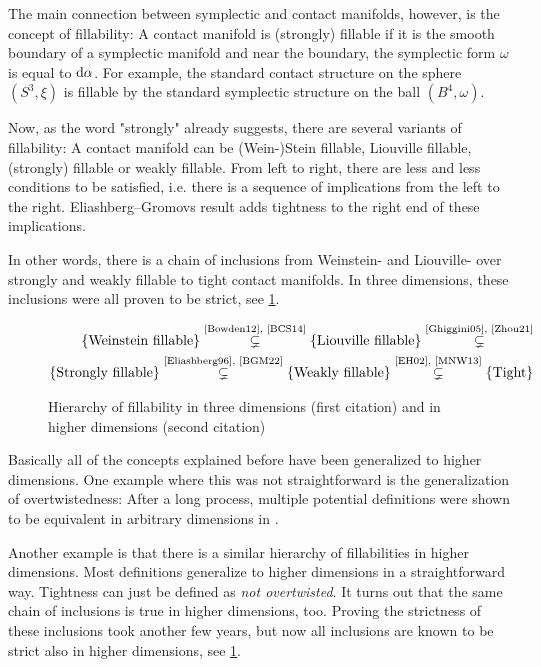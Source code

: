 The main connection between symplectic and contact manifolds, however, is the concept of fillability:
A contact manifold is (strongly) fillable if it is the smooth boundary of a symplectic manifold and
near the boundary, the symplectic form $\omega$ is equal to $\mathrm{d} \alpha$.
For example, the standard contact structure on the sphere $(S^3, \xi)$ is fillable
by the standard symplectic structure on the ball $(B^4, \omega)$.

Now, as the word "strongly" already suggests, there are several variants of fillability:
A contact manifold can be (Wein-)Stein fillable, Liouville fillable, (strongly) fillable or weakly fillable.
From left to right, there are less and less conditions to be satisfied, i.e. there is a sequence
of implications from the left to the right. 
Eliashberg--Gromovs result adds tightness to the right end of these implications.

In other words, there is a chain of inclusions from 
Weinstein- and Liouville- over strongly and weakly fillable to tight contact manifolds.
In three dimensions, these inclusions were all proven to be strict, see \cref{fig:fillability}.
\begin{figure}
    \begin{align*}
        \{\text{Weinstein fillable}\} \stackrel{\text{\cite{Bowden12}, \cite{BCS14}}}{\subsetneq} 
        \{\text{Liouville fillable}\} \stackrel{\text{\cite{Ghiggini05}, \cite{Zhou21}}}{\subsetneq}\\
        \{\text{Strongly  fillable}\} \stackrel{\text{\cite{Eliashberg96}, \cite{BGM22}}}{\subsetneq}
        \{\text{Weakly    fillable}\} \stackrel{\text{\cite{EH02}, \cite{MNW13}}}{\subsetneq}
        \{\text{Tight}\}
    \end{align*}
    \caption{Hierarchy of fillability in three dimensions (first citation) and in higher dimensions (second citation)}
    \label{fig:fillability}
\end{figure}

Basically all of the concepts explained before have been generalized to higher dimensions.
One example where this was not straightforward is the generalization of overtwistedness: 
After a long process, multiple potential definitions were shown to be equivalent in arbitrary dimensions in \cite{BEM15}.

Another example is that there is a similar hierarchy of fillabilities in higher dimensions. 
Most definitions generalize to higher dimensions in a straightforward way. Tightness can just be defined as \textit{not overtwisted}.
It turns out that the same chain of inclusions is true in higher dimensions, too.
Proving the strictness of these inclusions took another few years, but now all inclusions are known to be strict also in higher dimensions, 
see \cref{fig:fillability}.

